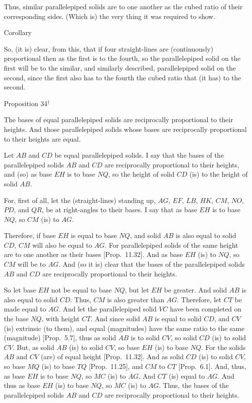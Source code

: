 Thus, similar parallelepiped solids are to one another
as the cubed ratio of  their corresponding sides. (Which is) the very thing it
was required to show.


\begin{center}
{\large Corollary}
\end{center}
So, (it is) clear, from this,  that if four straight-lines are (continuously)
proportional then as the first is to the fourth, so the parallelepiped
solid on the first will be to the similar, and similarly described, parallelepiped solid on the second, since the first also has to the fourth the
cubed ratio  that (it has) to the second.


\begin{center}
{\large Proposition 34}$^\dag$
\end{center}

The  bases of equal parallelepiped solids are reciprocally proportional to their heights. And those parallelepiped solids
whose bases are reciprocally proportional to their heights are equal.

Let $AB$ and $CD$ be equal parallelepiped solids. I say that the
bases of the parallelepiped solids $AB$ and $CD$ are reciprocally
proportional to their heights, and (so) as base $EH$ is to base $NQ$, so the
height of solid $CD$ (is) to the height of solid $AB$.

For, first of all, let the (straight-lines) standing up, $AG$, $EF$, $LB$, $HK$, $CM$,
$NO$, $PD$, and $QR$,  be at right-angles to their bases. I say that
as base $EH$ is to base $NQ$, so $CM$ (is) to $AG$.

Therefore, if base $EH$ is equal to base $NQ$, and solid $AB$ is also
equal to solid $CD$, $CM$ will also be equal to $AG$. For
parallelepiped solids of the same height are to one another as their bases [Prop.~11.32]. And as base $EH$ (is) to $NQ$,
so $CM$ will be to $AG$. And (so it is) clear that the bases of the parallelepiped
solids $AB$ and $CD$ are reciprocally proportional to their heights.

\epsfysize=1.9in
\centerline{}

So let base $EH$ not be equal to base $NQ$, but let $EH$ be greater. And
solid $AB$ is also equal to solid $CD$. Thus, $CM$ is also greater than $AG$.  Therefore, let $CT$ be made equal to $AG$. And let the parallelepiped
solid $VC$ have been completed on the base $NQ$, with height $CT$.
And since solid $AB$ is equal to solid $CD$, and $CV$ (is)
extrinsic (to them), and equal (magnitudes) have the same ratio to the
same (magnitude) [Prop.~5.7], thus as solid
$AB$ is to solid $CV$, so solid $CD$ (is) to solid $CV$. But, as
solid $AB$ (is) to solid $CV$, so base $EH$ (is) to base $NQ$. For the solids $AB$ and $CV$ (are) of equal
height [Prop.~11.32]. And as solid $CD$ (is) to solid $CV$, so base $MQ$ (is) to 
base $TQ$ [Prop.~11.25], and $CM$ to $CT$
[Prop.~6.1].
And, thus, as base $EH$ is to base $NQ$, so $MC$ (is) to $AG$.
And $CT$ (is) equal to $AG$. And
thus as base $EH$ (is) to base $NQ$, so $MC$ (is) to $AG$. Thus, the
bases of the parallelepiped solids $AB$ and $CD$ are reciprocally proportional to their
heights.

